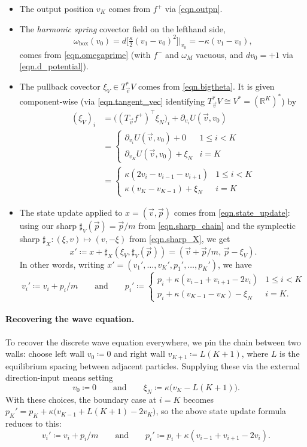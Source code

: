 \documentclass[11pt, oneside, article]{memoir}
\theoremstyle{definition}
\theoremstyle{plain}
\newcommand{\rr}{\mathbb{R}}
\newcommand{\qqand}{\qquad\text{and}\qquad}
\newcommand{\boxob}{\mathrm{box}}
\newcommand{\inpt}[1]{#1^{-}}
\newcommand{\outp}[1]{#1^{+}}
\begin{document}
\begin{itemize}
\item The output position $v_K$ comes from $\outp f$ via \eqref{eqn.outpn}.
\item The \emph{harmonic spring} covector field on the lefthand side,
\[\omega_\boxob(v_0)=d\bigl[\tfrac{\kappa}{2}(v_1-v_0)^2\bigr]\big|_{v_0}=-\kappa(v_1-v_0),\]
comes from \eqref{eqn.omegaprime} (with $\inpt f$ and $\omega_M$ vacuous, and $dv_0=+1$ via \eqref{eqn.d_potential}).
\item The pullback covector $\xi_V\in T^*_{\vec v}V$ comes from \eqref{eqn.bigtheta}. It is given component-wise (via \eqref{eqn.tangent_vec} identifying $T^*_{\vec v}V\cong V^*=(\rr^K)^*$) by
\begin{align*}
(\xi_V)_i&=
\bigl((T_{\vec v}\outp f)^\top\xi_N\bigr)_i+\partial_{v_i}U(\vec v,v_0)\\&=
\begin{cases}\partial_{v_i}U(\vec v,v_0)+0&1\leq i<K\\ \partial_{v_K}U(\vec v,v_0)+\xi_N&i=K\end{cases}\\&=
\begin{cases}\kappa(2v_i-v_{i-1}-v_{i+1})&1\leq i<K\\ \kappa(v_K-v_{K-1})+\xi_N&i=K\end{cases}
\end{align*}
\item The state update applied to $x=(\vec v,\vec p)$ comes from \eqref{eqn.state_update}: using our sharp $\sharp_V(\vec p)=\vec p/m$ from \eqref{eqn.sharp_chain} and the symplectic sharp $\sharp_X\colon(\xi,v)\mapsto(v,-\xi)$ from \eqref{eqn.sharp_X}, we get
\[
x'\coloneqq x+\sharp_X(\xi_V,\sharp_V(\vec p))=(\vec v+\vec p/m,\,\vec p-\xi_V).
\]
In other words, writing $x'=(v_1',\ldots,v_K',p_1',\ldots,p_K')$, we have
\[
v_i'\coloneqq v_i+p_i/m
\qqand
p_i'\coloneqq\begin{cases}p_i+\kappa(v_{i-1}+v_{i+1}-2v_i)&1\leq i<K\\ p_i+\kappa(v_{K-1}-v_K)-\xi_N&i=K.\end{cases}
\]
\end{itemize}

\paragraph{Recovering the wave equation.}
To recover the discrete wave equation everywhere, we pin the chain between two walls: choose left wall $v_0\coloneqq 0$ and right wall $v_{K+1}\coloneqq L(K+1)$, where $L$ is the equilibrium spacing between adjacent particles. Supplying these via the external direction-input means setting
\begin{equation}\label{eqn.wave_bc}
v_0\coloneqq 0\qqand\xi_N\coloneqq \kappa\bigl(v_K-L(K+1)\bigr).
\end{equation}
With these choices, the boundary case at $i=K$ becomes $p_K'=p_K+\kappa\bigl(v_{K-1}+L(K+1)-2v_K\bigr)$, so the above state update formula reduces to this:
\begin{equation}\label{eqn.state_update_explicit}
v_i'\coloneqq v_i+p_i/m
\qqand
p_i'\coloneqq p_i+\kappa(v_{i-1}+v_{i+1}-2v_i).
\end{equation}
\end{document}
